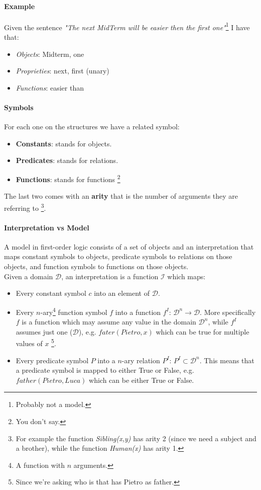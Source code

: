 \documentclass[10pt,a4paper]{article}
\begin{document}
\paragraph{Example}
Given the sentence \textit{"The next MidTerm will be easier then the first one"}\footnote{Probably not a model.} I have that:
\begin{itemize}
\item \textit{Objects}: Midterm, one
\item \textit{Proprieties}: next, first (unary)
\item \textit{Functions}: easier than
\end{itemize}


\paragraph{Symbols} For each one on the structures we have a related symbol:
\begin{itemize}
\item \textbf{Constants}: stands for objects.
\item \textbf{Predicates}: stands for relations.
\item \textbf{Functions}: stands for functions \footnote{You don't say.}
\end{itemize}
The last two comes with an \textbf{arity} that is the number of arguments they are referring to \footnote{For example the function \textit{Sibling(x,y)} has arity 2 (since we need a subject and a brother), while the function \textit{Human(x)} has arity 1.}.

\paragraph{Interpretation vs Model}
A model in first-order logic consists of a set of objects and an interpretation that maps constant symbols to objects, predicate symbols to relations on those objects, and function symbols to functions on those objects.\\
Given a domain $\mathcal{D}$, an interpretation is a function $\mathcal{I}$ which maps:
\begin{itemize}
\item Every constant symbol $c$ into an element of $\mathcal{D}$.
\item Every $n$-ary\footnote{A function with $n$ arguments.} function symbol $f$ into a  function $f^I$: $\mathcal{D}^n\rightarrow \mathcal{D}$. More specifically $f$ is a function which may assume any value in the domain $\mathcal{D}^n$, while $f^I$ assumes just one ($\mathcal{D}$), e.g. $fater(Pietro,x)$ which can be true for multiple values of $x$ \footnote{Since we're asking who is that has Pietro as father.}.
\item Every predicate symbol $P$ into a  $n$-ary relation $P^I$: $P^I\subset \mathcal{D}^n$. This means that a predicate symbol is mapped to either True or False, e.g. $father(Pietro,Luca)$ which can be either True or False.
\end{itemize}
\end{document}
